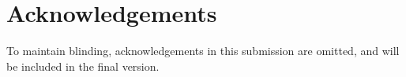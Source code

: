 \section*{Acknowledgements}

To maintain blinding, acknowledgements in this submission are omitted, and will be included in the final version.

